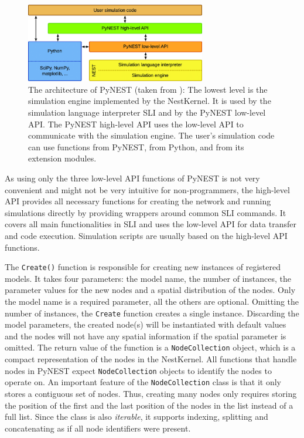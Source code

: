 \begin{figure}[ht!]
\centering
\includegraphics[width=0.7\textwidth]{src/pic/The-architecture-of-PyNEST-The-lowest-level-is-the-simulation-engine-It-is-used-by.png}
\caption{The architecture of PyNEST (taken from \citep{epp}): The lowest level is the simulation engine implemented by the NestKernel. It is used by the simulation language interpreter SLI and by the PyNEST low-level API. The PyNEST high-level API uses the low-level API to communicate with the simulation engine. The user’s simulation code can use functions from PyNEST, from Python, and from its extension modules.}
\label{fig:pynest}
\end{figure}

As using only the three low-level API functions of PyNEST is not very convenient and might not be very intuitive for non-programmers, the high-level API provides all necessary functions for creating the network and running simulations directly by providing wrappers around common SLI commands. It covers all main functionalities in SLI and uses the low-level API for data transfer and code execution. Simulation scripts are usually based on the high-level API functions.

The \texttt{Create()} function is responsible for creating new instances of registered models. It takes four parameters: the model name, the number of instances, the parameter values for the new nodes and a spatial distribution of the nodes. Only the model name is a required parameter, all the others are optional. Omitting the number of instances, the \texttt{Create} function creates a single instance. Discarding the model parameters, the created node(s) will be instantiated with default values and the nodes will not have any spatial information if the spatial parameter is omitted. The return value of the function is a \texttt{NodeCollection} object, which is a compact representation of the nodes in the NestKernel. All functions that handle nodes in PyNEST expect \texttt{NodeCollection} objects to identify the nodes to operate on. An important feature of the \texttt{NodeCollection} class is that it only stores a contiguous set of nodes. Thus, creating many nodes only requires storing the position of the first and the last position of the nodes in the list instead of a full list. Since the class is also \emph{iterable}, it supports indexing, splitting and concatenating as if all node identifiers were present.

